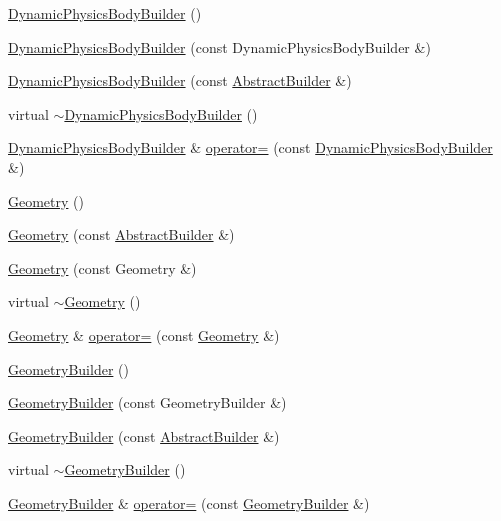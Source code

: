 \begin{DoxyCompactItemize}
\item 
\hyperlink{namespacejli_a2f8ceeb7f6753810b5778f1f4e2ffcff}{Dynamic\+Physics\+Body\+Builder} ()
\item 
\hyperlink{namespacejli_a925718f179e05461f123aec7d49e2302}{Dynamic\+Physics\+Body\+Builder} (const Dynamic\+Physics\+Body\+Builder \&)
\item 
\hyperlink{namespacejli_a09d63a7b6aeebc6c1adc2d29cad4a436}{Dynamic\+Physics\+Body\+Builder} (const \hyperlink{classjli_1_1_abstract_builder}{Abstract\+Builder} \&)
\item 
virtual \hyperlink{namespacejli_a08c80dbab444bb2250f72c44561b3137}{$\sim$\+Dynamic\+Physics\+Body\+Builder} ()
\item 
\hyperlink{namespacejli_a2f8ceeb7f6753810b5778f1f4e2ffcff}{Dynamic\+Physics\+Body\+Builder} \& \hyperlink{namespacejli_ab8cc09c315dd5eeaa1e5db63da094b52}{operator=} (const \hyperlink{namespacejli_a2f8ceeb7f6753810b5778f1f4e2ffcff}{Dynamic\+Physics\+Body\+Builder} \&)
\item 
\hyperlink{namespacejli_ac063e70317c4eccadadf9d805956a87b}{Geometry} ()
\item 
\hyperlink{namespacejli_a552c53ee3e235bf331151d3790926346}{Geometry} (const \hyperlink{classjli_1_1_abstract_builder}{Abstract\+Builder} \&)
\item 
\hyperlink{namespacejli_a3f790419c37591e236dbbeb4b11527df}{Geometry} (const Geometry \&)
\item 
virtual \hyperlink{namespacejli_a9cc315b0120d6422b18074d035e375dd}{$\sim$\+Geometry} ()
\item 
\hyperlink{namespacejli_ac063e70317c4eccadadf9d805956a87b}{Geometry} \& \hyperlink{namespacejli_a35f6fd9cb84a92ee1a41e074d4ec09bf}{operator=} (const \hyperlink{namespacejli_ac063e70317c4eccadadf9d805956a87b}{Geometry} \&)
\item 
\hyperlink{namespacejli_a0e63e2a5bcaa55a7526257c8e6a91531}{Geometry\+Builder} ()
\item 
\hyperlink{namespacejli_a3d074d26030ba005edd7dc2d2ecf5e55}{Geometry\+Builder} (const Geometry\+Builder \&)
\item 
\hyperlink{namespacejli_a004bdd1f9192de71fa05cffd2893f2f4}{Geometry\+Builder} (const \hyperlink{classjli_1_1_abstract_builder}{Abstract\+Builder} \&)
\item 
virtual \hyperlink{namespacejli_aa459cb842ce78ca87f46e048d1f0181b}{$\sim$\+Geometry\+Builder} ()
\item 
\hyperlink{namespacejli_a0e63e2a5bcaa55a7526257c8e6a91531}{Geometry\+Builder} \& \hyperlink{namespacejli_a73c17d348157cd5a98476f9bb232ffb3}{operator=} (const \hyperlink{namespacejli_a0e63e2a5bcaa55a7526257c8e6a91531}{Geometry\+Builder} \&)

\end{DoxyCompactItemize}
